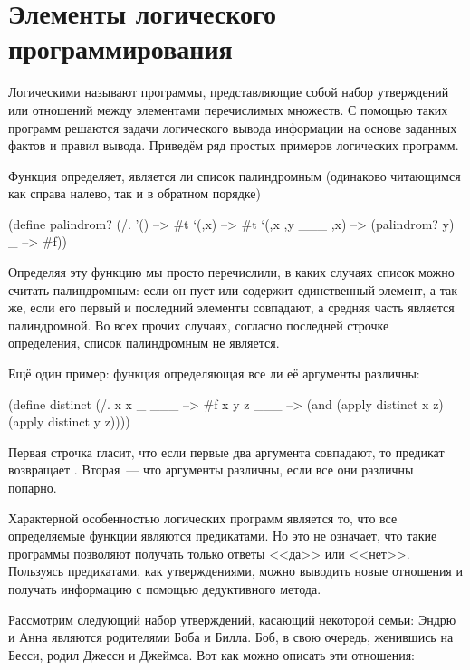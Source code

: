 \section{Элементы логического программирования}%
Логическими называют программы, представляющие собой набор утверждений или отношений между элементами перечислимых множеств. С помощью таких программ решаются задачи логического вывода информации на основе заданных фактов и правил вывода.
Приведём ряд простых примеров логических программ.

Функция  определяет, является ли список палиндромным (одинаково читающимся как справа налево, так и в обратном порядке)

\begin{SchemeCode}[emph={x,y}]
(define palindrom?
  (/. '() --> #t
      `(,x) --> #t
      `(,x ,y ___ ,x) --> (palindrom? y)
      _ --> #f))
\end{SchemeCode}

Определяя эту функцию мы просто перечислили, в каких случаях список можно считать палиндромным: если он пуст или содержит единственный элемент, а так же, если его первый и последний элементы совпадают, а средняя часть является палиндромной. Во всех прочих случаях, согласно последней строчке определения, список палиндромным не является.

Ещё один пример: функция  определяющая все ли её аргументы различны:

\begin{SchemeCode}
(define distinct
  (/. x x _ ___ --> #f
      x y z ___ --> (and (apply distinct x z)
                         (apply distinct y z))))
\end{SchemeCode}

Первая строчка гласит, что если первые два аргумента совпадают, то предикат возвращает . Вторая~--- что аргументы различны, если все они различны попарно.

Характерной особенностью логических программ является то, что все определяемые функции являются предикатами. Но это не означает, что такие программы позволяют получать только ответы <<да>> или <<нет>>. Пользуясь предикатами, как утверждениями, можно выводить новые отношения и получать информацию с помощью дедуктивного метода.

Рассмотрим следующий набор утверждений, касающий некоторой семьи:
Эндрю и Анна являются родителями Боба и Билла. Боб, в свою очередь, женившись на Бесси, родил Джесси и Джеймса. Вот как можно описать эти отношения:

